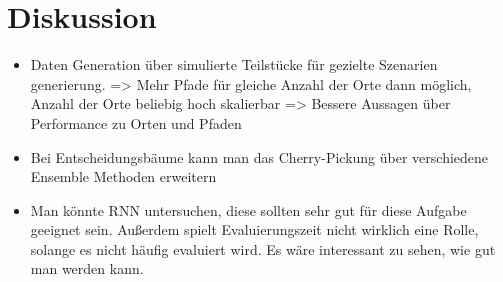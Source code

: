 \chapter{Diskussion}
\begin{itemize}
    \item Daten Generation über simulierte Teilstücke für gezielte Szenarien generierung. => Mehr Pfade für gleiche Anzahl der Orte dann möglich,
          Anzahl der Orte beliebig hoch skalierbar => Bessere Aussagen über Performance zu Orten und Pfaden
    \item Bei Entscheidungsbäume kann man das Cherry-Pickung über verschiedene Ensemble Methoden erweitern
    \item Man könnte RNN untersuchen, diese sollten sehr gut für diese Aufgabe geeignet sein. Außerdem spielt Evaluierungszeit nicht wirklich eine Rolle, solange es nicht häufig evaluiert wird.
          Es wäre interessant zu sehen, wie gut man werden kann.
\end{itemize}